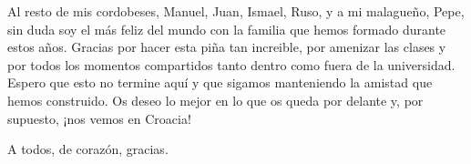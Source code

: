 Al resto de mis cordobeses, Manuel, Juan, Ismael, Ruso, y a mi malagueño, Pepe, sin duda soy el más feliz del mundo con la familia que hemos formado durante estos años. Gracias por hacer esta piña tan increible, por amenizar las clases y por todos los momentos compartidos tanto dentro como fuera de la universidad. Espero que esto no termine aquí y que sigamos manteniendo la amistad que hemos construido. Os deseo lo mejor en lo que os queda por delante y, por supuesto, ¡nos vemos en Croacia!

A todos, de corazón, gracias.
